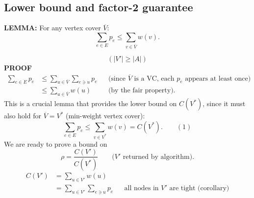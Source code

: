 \subsection{Lower bound and factor-2 guarantee}
\begin{notesresult}
\textbf{LEMMA:} For any vertex cover $\overline V$:
\[\sum_{e\in E}p_e\leq\sum_{v\in\overline V}w(v).\]
\end{notesresult}
\[ (|V'|\geq|A|) \]
\textbf{PROOF}
\begin{align*}
\sum_{e\in E}p_e&\leq\sum_{u\in\overline V}\sum_{e\ni u}p_e
&&\text{(since $\overline V$ is a VC, each $p_e$ appears at least once)}\\
&\leq\sum_{u\in\overline V}w(u)&&\text{(by the fair property).}
\end{align*}
This is a crucial lemma that provides the lower bound on $C(V^*)$, since it must also hold for $\overline V=V^*$ (min-weight vertex cover):
\[\sum_{e\in E}p_e\leq\sum_{v\in V^*}w(v)=C(V^*).\qquad(1)\]
We are ready to prove a bound on
\[\rho=\frac{C(V')}{C(V^*)}\qquad\text{($V'$ returned by algorithm).}\]
\begin{align*}
C(V')&=\sum_{u\in V'}w(u)\\
&=\sum_{u\in V'}\sum_{e\ni u}p_e&&\text{all nodes in $V'$ are tight (corollary)}
\end{align*}
